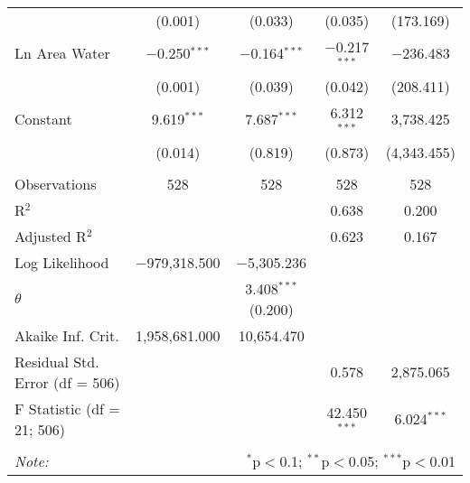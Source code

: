 \begin{table}[!htbp]
\begin{tabular}{@{\extracolsep{5pt}}lcccc}
  & (0.001) & (0.033) & (0.035) & (173.169) \\ 
  Ln Area Water & $-$0.250$^{***}$ & $-$0.164$^{***}$ & $-$0.217$^{***}$ & $-$236.483 \\ 
  & (0.001) & (0.039) & (0.042) & (208.411) \\ 
  Constant & 9.619$^{***}$ & 7.687$^{***}$ & 6.312$^{***}$ & 3,738.425 \\ 
  & (0.014) & (0.819) & (0.873) & (4,343.455) \\ 
 \hline \\[-1.8ex] 
Observations & 528 & 528 & 528 & 528 \\ 
R$^{2}$ &  &  & 0.638 & 0.200 \\ 
Adjusted R$^{2}$ &  &  & 0.623 & 0.167 \\ 
Log Likelihood & $-$979,318.500 & $-$5,305.236 &  &  \\ 
$\theta$ &  & 3.408$^{***}$  (0.200) &  &  \\ 
Akaike Inf. Crit. & 1,958,681.000 & 10,654.470 &  &  \\ 
Residual Std. Error (df = 506) &  &  & 0.578 & 2,875.065 \\ 
F Statistic (df = 21; 506) &  &  & 42.450$^{***}$ & 6.024$^{***}$ \\ 
\hline 
\hline \\[-1.8ex] 
\textit{Note:}  & \multicolumn{4}{r}{$^{*}$p$<$0.1; $^{**}$p$<$0.05; $^{***}$p$<$0.01} \\ 
\end{tabular} 
\end{table} 
